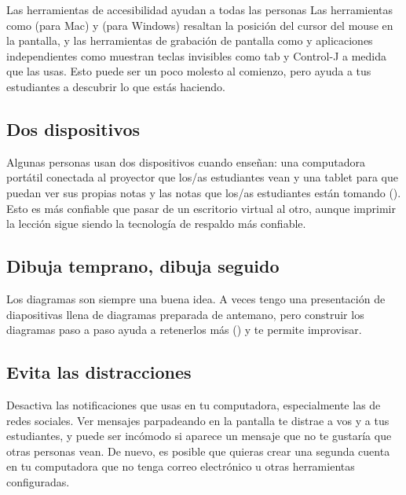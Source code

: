 \begin{aside}{Las herramientas de accesibilidad ayudan a todas las personas}
  Las herramientas como  (para Mac)
  y  (para Windows)
  resaltan la posición del cursor del mouse en la pantalla,
  y las herramientas de grabación de pantalla como 
  y aplicaciones independientes como 
  muestran teclas invisibles como tab y Control-J a medida que las usas.
  Esto puede ser un poco molesto al comienzo,
  pero ayuda a tus estudiantes a descubrir lo que estás haciendo.
\end{aside}

\subsection*{Dos dispositivos}

Algunas personas usan dos dispositivos cuando enseñan:
una computadora portátil conectada al proyector que los/as estudiantes vean
y una tablet para que puedan ver sus propias notas y las notas que los/as estudiantes están tomando ().
Esto es más confiable que pasar de un escritorio virtual al otro, 
aunque imprimir la lección sigue siendo la tecnología de respaldo más confiable.

\subsection*{Dibuja temprano, dibuja seguido}

Los diagramas son siempre una buena idea.
A veces tengo una presentación de diapositivas llena de diagramas preparada de antemano,
pero construir los diagramas paso a paso ayuda a retenerlos más ()
y te permite improvisar.

\subsection*{Evita las distracciones}

Desactiva las notificaciones que usas en tu computadora,
especialmente las de redes sociales.
Ver mensajes parpadeando en la pantalla te distrae a vos y a tus estudiantes,
y puede ser incómodo si aparece un mensaje que no te gustaría que otras personas vean.
De nuevo,
es posible que quieras crear una segunda cuenta en tu computadora que no tenga correo electrónico u otras herramientas configuradas.

